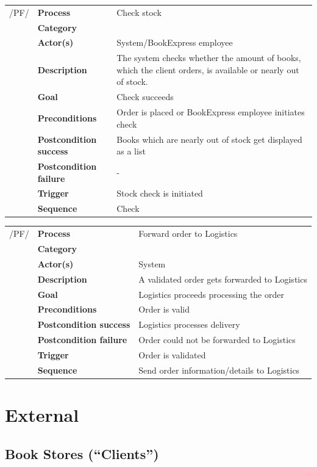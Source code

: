 \documentclass[11pt,a4paper,oneside,svgnames]{report}
\begin{document}
\begin{tabular}{p{1.5cm}p{3cm}p{8cm}}
	 /PF/	& \textbf{Process} & Check stock\\ 
		& \textbf{Category} & \\
		& \textbf{Actor(s)} & System/BookExpress employee\\ 
		& \textbf{Description}	 & The system checks whether the amount of books, which the client orders, is available or nearly out of stock.\\ 
		& \textbf{Goal} & Check succeeds\\
		& \textbf{Preconditions} & Order is placed or BookExpress employee initiates check\\
		& \textbf{Postcondition success} & Books which are nearly out of stock get displayed as a list\\
		& \textbf{Postcondition failure} & -\\
		& \textbf{Trigger} & Stock check is initiated\\
		& \textbf{Sequence} & Check \\
\end{tabular}

\begin{tabular}{p{1.5cm}p{3cm}p{8cm}}
	 /PF/	& \textbf{Process} & Forward order to Logistics\\ 
		& \textbf{Category} & \\
		& \textbf{Actor(s)} & System\\ 
		& \textbf{Description}	 & A validated order gets forwarded to Logistics\\ 
		& \textbf{Goal} & Logistics proceeds processing the order\\
		& \textbf{Preconditions} & Order is valid\\
		& \textbf{Postcondition success} & Logistics processes delivery\\
		& \textbf{Postcondition failure} & Order could not be forwarded to Logistics\\
		& \textbf{Trigger} & Order is validated\\
		& \textbf{Sequence} & Send order information/details to Logistics\\
\end{tabular}


\section{External}
\subsection{Book Stores (``Clients'')}
\end{document}
